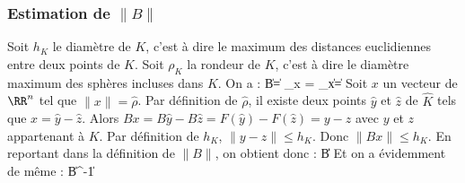 \subsubsection{Estimation de $\|B\|$}
%
\noindent
%
Soit $h_K$ le diam\`etre de $K$, c'est \`a dire le maximum des distances euclidiennes entre deux points de $K$. Soit $\rho_K$ la rondeur de $K$, c'est \`a dire le diam\`etre maximum des sph\`eres incluses dans $K$. On a :
\be
\|B\| = \sup_{x}  = \sup_{\|x\|=\hat{\rho}} 
\ee
%
Soit $x$ un vecteur de $\RR^n$ tel que $\|x\|=\hat{\rho}$. Par d\'efinition de $\hat{\rho}$, il existe deux points $\hat{y}$ et $\hat{z}$ de $\hat{K}$ tels que $x=\hat{y}-\hat{z}$. Alors $Bx=B\hat{y}-B\hat{z}=F(\hat{y})-F(\hat{z})=y-z$ avec $y$ et $z$ appartenant \`a $K$. Par d\'efinition de $h_K$, $\|y-z\| \le h_K$. Donc $\|Bx\| \le h_K$. En reportant dans la d\'efinition de $\|B\|$, on obtient donc :
\be
\|B\| \le {}
\label{eq:kk1}
\ee
%
Et on a \'evidemment de m\^eme :
\be
\|B^{-1}\| \le {}
\label{eq:kk2}
\ee
%
%
